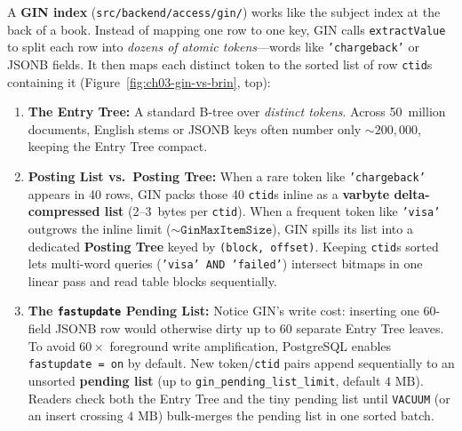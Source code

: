 A \textbf{GIN index} (\texttt{src/backend/access/gin/}) works like the subject index at the back of a book. Instead of mapping one row to one key, GIN calls \texttt{extractValue} to split each row into \emph{dozens of atomic tokens}---words like \texttt{'chargeback'} or JSONB fields. It then maps each distinct token to the sorted list of row \texttt{ctid}s containing it (Figure~\ref{fig:ch03-gin-vs-brin}, top):
\begin{enumerate}
  \item \textbf{The Entry Tree:} A standard B-tree over \emph{distinct tokens}. Across 50~million documents, English stems or JSONB keys often number only $\sim 200{,}000$, keeping the Entry Tree compact.
  \item \textbf{Posting List vs.\ Posting Tree:} When a rare token like \texttt{'chargeback'} appears in 40 rows, GIN packs those 40 \texttt{ctid}s inline as a \textbf{varbyte delta-compressed list} (2--3~bytes per \texttt{ctid}). When a frequent token like \texttt{'visa'} outgrows the inline limit ($\sim\texttt{GinMaxItemSize}$), GIN spills its list into a dedicated \textbf{Posting Tree} keyed by \texttt{(block, offset)}. Keeping \texttt{ctid}s sorted lets multi-word queries (\texttt{'visa' AND 'failed'}) intersect bitmaps in one linear pass and read table blocks sequentially.
  \item \textbf{The \texttt{fastupdate} Pending List:} Notice GIN's write cost: inserting one 60-field JSONB row would otherwise dirty up to 60 separate Entry Tree leaves. To avoid $60\times$ foreground write amplification, PostgreSQL enables \texttt{fastupdate = on} by default. New token/\texttt{ctid} pairs append sequentially to an unsorted \textbf{pending list} (up to \texttt{gin\_pending\_list\_limit}, default $4\text{ MB}$). Readers check both the Entry Tree and the tiny pending list until \texttt{VACUUM} (or an insert crossing $4\text{ MB}$) bulk-merges the pending list in one sorted batch.
\end{enumerate}

